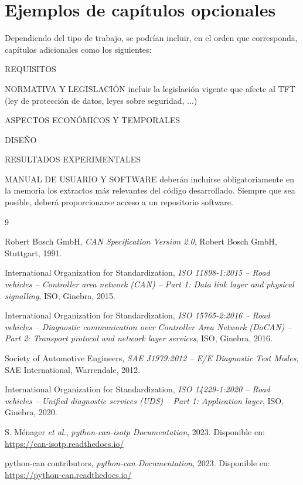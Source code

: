 \documentclass[oneside,12pt]{book}
\begin{document}
\section{Ejemplos de capítulos opcionales}

Dependiendo del tipo de trabajo, se podrían incluir, en el orden que corresponda, capítulos adicionales como los siguientes:

\begin{description}
\item{REQUISITOS}
\item{NORMATIVA Y LEGISLACIÓN} incluir la legislación vigente que afecte al TFT (ley de protección de datos, leyes sobre seguridad, ...)
\item{ASPECTOS ECONÓMICOS Y TEMPORALES}
\item{DISEÑO}
\item{RESULTADOS EXPERIMENTALES}
\item{MANUAL  DE  USUARIO  Y  SOFTWARE}  deberán  incluirse  obligatoriamente  en  la  memoria  los extractos más relevantes   del código desarrollado. Siempre que sea posible, deberá   proporcionarse acceso a un repositorio software.
\end{description}


\clearpage

\begin{thebibliography}{9}

Robert Bosch GmbH,
\textit{CAN Specification Version 2.0},
Robert Bosch GmbH, Stuttgart, 1991.

International Organization for Standardization,
\textit{ISO 11898-1:2015 -- Road vehicles -- Controller area network (CAN) --
Part 1: Data link layer and physical signalling},
ISO, Ginebra, 2015.

International Organization for Standardization,
\textit{ISO 15765-2:2016 -- Road vehicles -- Diagnostic communication over
Controller Area Network (DoCAN) -- Part 2: Transport protocol and
network layer services},
ISO, Ginebra, 2016.

Society of Automotive Engineers,
\textit{SAE J1979:2012 -- E/E Diagnostic Test Modes},
SAE International, Warrendale, 2012.

International Organization for Standardization,
\textit{ISO 14229-1:2020 -- Road vehicles -- Unified diagnostic services (UDS) --
Part 1: Application layer},
ISO, Ginebra, 2020.

S. Ménager \textit{et al.},
\textit{python-can-isotp Documentation},
2023. Disponible en: \url{https://can-isotp.readthedocs.io/}

python-can contributors,
\textit{python-can Documentation},
2023. Disponible en: \url{https://python-can.readthedocs.io/}

\end{thebibliography}

\printglossaries
\end{document}
